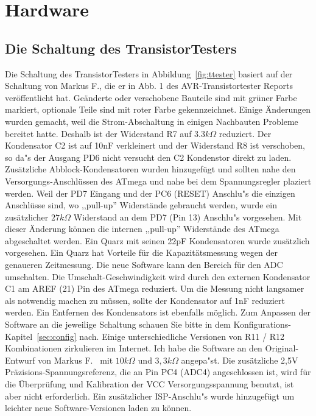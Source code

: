 \chapter{Hardware}

\section{Die Schaltung des TransistorTesters}
Die Schaltung des TransistorTesters in Abbildung~\ref{fig:ttester} basiert auf der Schaltung von
Markus F., die er in Abb. 1 des AVR-Transistortester Reports \cite{Frejek} ver\"offentlicht hat.
Ge\"anderte oder verschobene Bauteile sind mit gr\"uner Farbe markiert, optionale Teile sind
mit roter Farbe gekennzeichnet.
Einige \"Anderungen wurden gemacht, weil die Strom-Abschaltung in einigen Nachbauten Probleme
bereitet hatte.
Deshalb ist der Widerstand R7 auf \(3.3k\Omega\) reduziert. 
Der Kondensator C2 ist auf 10nF verkleinert und der Widerstand R8 ist verschoben, so da"s der
Ausgang PD6 nicht versucht den C2 Kondenstor direkt zu laden.
Zus\"atzliche Abblock-Kondensatoren wurden hinzugef\"ugt und sollten nahe den Versorgungs-Anschl\"ussen
des ATmega und nahe bei dem Spannungsregler plaziert werden.
Weil der PD7 Eingang und der PC6 (RESET) Anschlu"s die einzigen Anschl\"usse sind, wo
,,pull-up'' Widerst\"ande gebraucht werden, wurde ein zus\"atzlicher \(27k\Omega\) Widerstand an dem PD7 (Pin 13) Anschlu"s vorgesehen.
Mit dieser \"Anderung k\"onnen die internen ,,pull-up'' Widerst\"ande des ATmega abgeschaltet werden.
Ein Quarz mit seinen 22pF Kondensatoren wurde zus\"atzlich vorgesehen.
Ein Quarz hat Vorteile f\"ur die Kapazit\"atsmessung wegen der genaueren Zeitmessung.
Die neue Software kann den Bereich f\"ur den ADC umschalten. Die Umschalt-Geschwindigkeit
wird durch den externen Kondensator C1 am AREF (21) Pin des ATmega reduziert.
Um die Messung nicht langsamer als notwendig machen zu m\"ussen, sollte der Kondensator auf
1nF reduziert werden. Ein Entfernen des Kondensators ist ebenfalls m\"oglich.
Zum Anpassen der Software an die jeweilige Schaltung schauen Sie bitte in dem
Konfigurations-Kapitel~\ref{sec:config} nach. 
Einige unterschiedliche Versionen von R11 / R12 Kombinationen zirkulieren im Internet.
Ich habe die Software an den Original-Entwurf von Markus F.~\cite{Frejek} mit \(10k\Omega\) und \(3,3k\Omega\) angepa"st.
Die zus\"atzliche 2,5V Pr\"azisions-Spannungsreferenz, die an Pin PC4 (ADC4) angeschlossen ist,
wird f\"ur die \"Uberpr\"ufung und Kalibration der VCC Versorgungsspannung benutzt, ist aber nicht
erforderlich.
Ein zus\"atzlicher ISP-Anschlu"s wurde hinzugef\"ugt um leichter neue Software-Versionen
laden zu k\"onnen.

